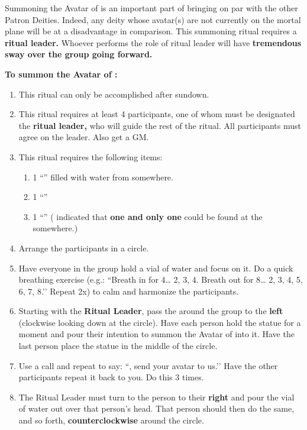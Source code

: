 \documentclass[green]{GL2020}
\begin{document}
\name{\gGensisAvatar{}}

Summoning the Avatar of \cGenesis{} is an important part of bringing \cGenesis{} on par with the other Patron Deities. Indeed, any deity whose avatar(s) are not currently on the mortal plane will be at a disadvantage in comparison. This summoning ritual requires a \textbf{ritual leader.} Whoever performs the role of ritual leader will have \textbf{tremendous sway over the group going forward.}

\textbf{To summon the Avatar of \cGenesis{}:}
\begin{enumerate}
  \item This ritual can only be accomplished after sundown.
  \item This ritual requires at least 4 participants, one of whom must be designated the \textbf{ritual leader,} who will guide the rest of the ritual. All participants must agree on the leader. Also get a GM.
  \item This ritual requires the following items:
    \begin{enumerate}
      \item 1 ``\iGlassVial{}'' filled with water from somewhere.
      \item 1 ``\iStoneFlower{}''
      \item 1 ``\iRabbitStatue{}''  (\cGenesis{} indicated that \textbf{one and only one} could be found at the \pSchool{} somewhere.)
    \end{enumerate}
  \item Arrange the participants in a circle.
  \item Have everyone in the group hold a vial of water and focus on it. Do a quick breathing exercise (e.g.: ``Breath in for 4… 2, 3, 4. Breath out for 8… 2, 3, 4, 5, 6, 7, 8.’’ Repeat 2x) to calm and harmonize the participants.
  \item Starting with the \textbf{Ritual Leader}, pass the \iRabbitStatue{} around the group to the \textbf{left} (clockwise looking down at the circle). Have each person hold the statue for a moment and pour their intention to summon the Avatar of \cGenesis{} into it. Have the last person place the statue in the middle of the circle.
  \item Use a call and repeat to say: ``\cGenesis{}, send your avatar to us.’’ Have the other participants repeat it back to you. Do this 3 times.
  \item The Ritual Leader must turn to the person to their \textbf{right} and pour the vial of water out over that person’s head. That person should then do the same, and so forth, \textbf{counterclockwise} around the circle.

\end{enumerate}
\end{document}
